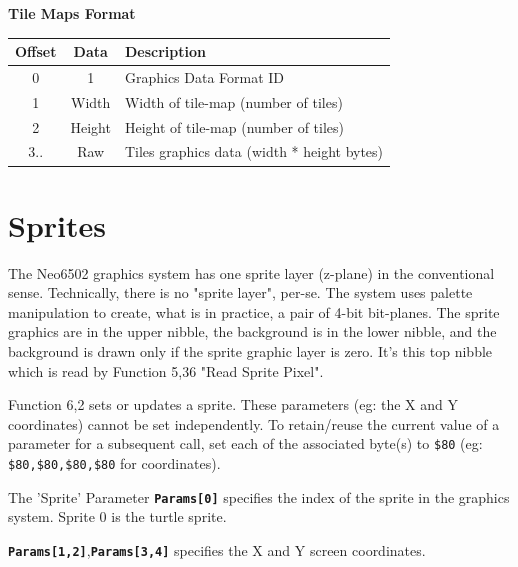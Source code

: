 \documentclass[12pt]{article}
\newcommand{\MonoSp}[1] {\fontsize{10pt}{10pt}\selectfont\texttt{#1}\normalsize}
\newcommand{\Param}[1] {\textbf{\texttt{Params[#1]}}}
\begin{document}
\begin{table}[h]
\centering\textbf{Tile Maps Format} \\
\begin{tabular}{ | c | c | l | }                                                \hline
\textbf{Offset} & \textbf{Data} & \textbf{Description}                       \\ \hline
0               & 1             & Graphics Data Format ID                    \\ \hline
1               & Width         & Width of tile-map (number of tiles)        \\ \hline
2               & Height        & Height of tile-map (number of tiles)       \\ \hline
3..             & Raw           & Tiles graphics data (width * height bytes) \\ \hline
\end{tabular}
\end{table}


\pagebreak


\section{Sprites}\label{sprite}

The Neo6502 graphics system has one sprite layer (z-plane) in the conventional sense.
Technically, there is no "sprite layer", per-se.
The system uses palette manipulation to create, what is in practice,
a pair of 4-bit bit-planes.
The sprite graphics are in the upper nibble, the background is in the lower nibble,
and the background is drawn only if the sprite graphic layer is zero.
It's this top nibble which is read by Function 5,36 "Read Sprite Pixel".
\newline

Function 6,2 sets or updates a sprite.
These parameters (eg: the X and Y coordinates) cannot be set independently.
To retain/reuse the current value of a parameter for a subsequent call,
set each of the associated byte(s) to \MonoSp{\$80}
(eg: \MonoSp{\$80,\$80,\$80,\$80} for coordinates).
\newline

The 'Sprite' Parameter \Param{0} specifies the index of the sprite in the graphics system.
Sprite 0 is the turtle sprite.
\newline

\Param{1,2},\Param{3,4} specifies the X and Y screen coordinates.
\newline
\end{document}
